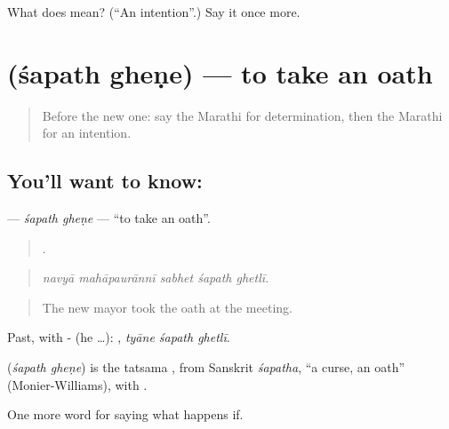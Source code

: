 \begin{tcolorbox}[breakable,colback=teal!4,colframe=teal!35!black,title={Before you move on}]
What does  mean? (\textquotedblleft{}An intention\textquotedblright{}.) Say it once more.
\end{tcolorbox}
\section[\texorpdfstring{\mr{शपथ} \mr{घेणे} (śapath gheṇe)}{शपथ घेणे (śapath gheṇe)}]{  (śapath gheṇe) — to take an oath}

\label{lesson:MR-C546-sapath-ghene}



\begin{quote}
Before the new one: say the Marathi for determination, then the Marathi for an intention.
\end{quote}

\subsection*{You'll want to know:  }
\textbf{ } — \emph{śapath gheṇe} — \textquotedblleft{}to take an oath\textquotedblright{}.

\begin{quote}
    .
\end{quote}

\begin{quote}
\emph{navyā mahāpaurānnī sabhet śapath ghetlī.}
\end{quote}

\begin{quote}
The new mayor took the oath at the meeting.
\end{quote}

Past, with - (he …):   , \emph{tyāne śapath ghetlī}.

\begin{cousinweb}
\textbf{ } (\emph{śapath gheṇe}) is the tatsama , from Sanskrit \emph{śapatha}, \textquotedblleft{}a curse, an oath\textquotedblright{} (Monier-Williams), with .
\end{cousinweb}

\begin{grammarlens}[title={What you've built}]
One more word for saying what happens if.
\end{grammarlens}

